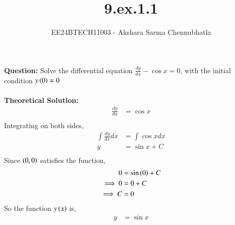 \documentclass[journal]{IEEEtran}
\begin{document}

\vspace{3cm}

\title{9.ex.1.1}
\author{EE24BTECH11003 - Akshara Sarma Chennubhatla}
{\let\newpage\relax\maketitle}
\textbf{Question:}
Solve the differential equation $\frac{dy}{dx} - \cos x = 0$, with the initial condition $y\left(0\right) = 0$\\

\solution\\
\textbf{Theoretical Solution:}\\

\begin{align}
	\frac{dy}{dx} &= \cos x\\
\end{align}
Integrating on both sides,
\begin{align}
	\int{\frac{dy}{dx}} dx &= \int{\cos x} dx\\
	y &= \sin x + C\\
\end{align}
Since $\left(0, 0\right)$ satisfies the function,
\begin{align}
	0 &= \sin\left(0\right) + C\\
	\implies 0 &= 0 + C\\
	\implies C &= 0\\
\end{align}
So the function $y\left(x\right)$ is,
\begin{align}
	y &= \sin x\\
\end{align}
\end{document}
